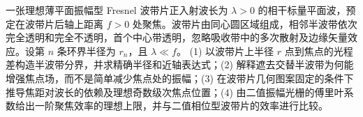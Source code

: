 一张理想薄平面振幅型 Fresnel 波带片正入射波长为 \(\lambda>0\) 的相干标量平面波，预定在波带片后轴上距离 \(f>0\) 处聚焦。波带片由同心圆区域组成，相邻半波带依次完全透明和完全不透明，首个中心带透明，忽略吸收带中的多次散射及边缘矢量效应。设第 \(n\) 条环界半径为 \(r_n\)，且 \(\lambda\ll f\)。
(1) 以波带片上半径 \(r\) 点到焦点的光程差构造半波带分界，并求精确半径和近轴表达式；(2) 解释遮去交替半波带为何能增强焦点场，而不是简单减少焦点处的振幅；(3) 在波带片几何图案固定的条件下推导焦距对波长的依赖及理想奇数级次焦点位置；(4) 由二值振幅光栅的傅里叶系数给出一阶聚焦效率的理想上限，并与二值相位型波带片的效率进行比较。
